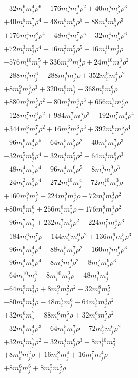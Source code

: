 {\begin{align*}
&-32m_i^{6}m_j^{4}\rho^{6}-176m_i^{5}m_j^{9}\rho^{2}+40m_i^{5}m_j^{8}\rho^{3}\\
&+40m_i^{5}m_j^{7}\rho^{4}+48m_i^{5}m_j^{6}\rho^{5}-88m_i^{4}m_j^{9}\rho^{3}\\
&+176m_i^{4}m_j^{8}\rho^{4}-48m_i^{4}m_j^{7}\rho^{5}-32m_i^{4}m_j^{6}\rho^{6}\\
&+72m_i^{3}m_j^{9}\rho^{4}-16m_i^{2}m_j^{9}\rho^{5}+16m_i^{11}m_j^{3}\rho\\
&-576m_i^{10}m_j^{5}+336m_i^{10}m_j^{4}\rho+24m_i^{10}m_j^{3}\rho^{2}\\
&-288m_i^{9}m_j^{6}-288m_i^{9}m_j^{5}\rho+352m_i^{9}m_j^{4}\rho^{2}\\
&+8m_i^{9}m_j^{3}\rho^{3}+320m_i^{8}m_j^{7}-368m_i^{8}m_j^{6}\rho\\
&+880m_i^{8}m_j^{5}\rho^{2}-80m_i^{8}m_j^{4}\rho^{3}+656m_i^{7}m_j^{7}\rho\\
&-128m_i^{7}m_j^{6}\rho^{2}+984m_i^{7}m_j^{5}\rho^{3}-192m_i^{7}m_j^{4}\rho^{4}\\
&+344m_i^{6}m_j^{7}\rho^{2}+16m_i^{6}m_j^{6}\rho^{3}+392m_i^{6}m_j^{5}\rho^{4}\\
&-96m_i^{6}m_j^{4}\rho^{5}+64m_i^{5}m_j^{8}\rho^{2}-40m_i^{5}m_j^{7}\rho^{3}\\
&-32m_i^{5}m_j^{6}\rho^{4}+32m_i^{4}m_j^{9}\rho^{2}+64m_i^{4}m_j^{8}\rho^{3}\\
&-48m_i^{4}m_j^{7}\rho^{4}-96m_i^{4}m_j^{6}\rho^{5}+8m_i^{3}m_j^{9}\rho^{3}\\
&-24m_i^{2}m_j^{9}\rho^{4}+272m_i^{10}m_j^{4}-72m_i^{10}m_j^{3}\rho\\
&+160m_i^{9}m_j^{5}+224m_i^{9}m_j^{4}\rho-72m_i^{9}m_j^{3}\rho^{2}\\
&+80m_i^{8}m_j^{6}+256m_i^{8}m_j^{5}\rho-176m_i^{8}m_j^{4}\rho^{2}\\
&-96m_i^{7}m_j^{7}+232m_i^{7}m_j^{5}\rho^{2}-224m_i^{7}m_j^{4}\rho^{3}\\
&-184m_i^{6}m_j^{7}\rho-144m_i^{6}m_j^{6}\rho^{2}+136m_i^{6}m_j^{5}\rho^{3}\\
&-96m_i^{6}m_j^{4}\rho^{4}-88m_i^{5}m_j^{7}\rho^{2}-160m_i^{5}m_j^{6}\rho^{3}\\
&-96m_i^{4}m_j^{6}\rho^{4}-8m_i^{3}m_j^{9}\rho^{2}-8m_i^{2}m_j^{9}\rho^{3}\\
&-64m_i^{10}m_j^{3}+8m_i^{10}m_j^{2}\rho-48m_i^{9}m_j^{4}\\
&-64m_i^{9}m_j^{3}\rho+8m_i^{9}m_j^{2}\rho^{2}-32m_i^{8}m_j^{5}\\
&-80m_i^{8}m_j^{4}\rho-48m_i^{7}m_j^{6}-64m_i^{7}m_j^{4}\rho^{2}\\
&+32m_i^{6}m_j^{7}-88m_i^{6}m_j^{6}\rho+32m_i^{6}m_j^{5}\rho^{2}\\
&-32m_i^{6}m_j^{4}\rho^{3}+64m_i^{5}m_j^{7}\rho-72m_i^{5}m_j^{6}\rho^{2}\\
&+32m_i^{4}m_j^{7}\rho^{2}-32m_i^{4}m_j^{6}\rho^{3}+8m_i^{10}m_j^{2}\\
&+8m_i^{9}m_j^{2}\rho+16m_i^{8}m_j^{4}+16m_i^{7}m_j^{4}\rho\\
&+8m_i^{6}m_j^{6}+8m_i^{5}m_j^{6}\rho
\end{align*}
}

